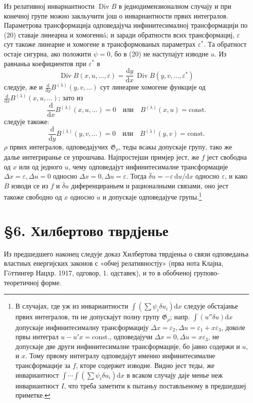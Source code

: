 ﻿\documentclass[11pt]{article}
\providecommand{\G}{\mathfrak G}
\providecommand{\eps}{\varepsilon}
\providecommand{\D}{\Delta}
\providecommand{\dd}{\mathrm d}
\DeclareMathOperator{\Div}{Div}
\providecommand{\bd}{\bar{\delta}}
\begin{document}
Из релативној инвариантности \(\Div B\) в једнодимензионалном случају и при конечној групе можно закльучити још о инвариантности првих интегралов. Параметрова трансформација одповедајуча инфинитесималној трансформацији по (20) ставаје линеарна и хомогеннá; и заради обратности всих трансформациј, \(\eps\) сут такоже линеарне и хомогене в трансформованых параметрах \(\eps^*\). Та обратност остаје сигурна, ако положити \(\psi=0\), бо в (20) не наступајут изводне \(u\). Из равнаньа коефициентов при \(\eps^*\) в
\[
\Div B(x,u,\ldots,\eps)=\frac{\dd y}{\dd x}\,\Div B(y,v,\ldots,\eps^*)
\]
следује, же и \(\frac{\dd}{\dd y}B^{(\lambda)}(y,v,\ldots)\) сут линеарне хомогене функције од \(\frac{\dd}{\dd x}B^{(\lambda)}(x,u,\ldots)\); зато из
\[
\frac{\dd}{\dd x}B^{(\lambda)}(x,u,\ldots)=0
\quad\text{или}\quad B^{(\lambda)}(x,u)=\mathrm{const.}
\]
следује такоже:
\[
\frac{\dd}{\dd y}B^{(\lambda)}(y,v,\ldots)=0
\quad\text{или}\quad B^{(\lambda)}(y,v)=\mathrm{const.}
\]
\(\rho\) првих интегралов, одповедајучих \(\G_\rho\), теды всакы допускаје групу, тако же далье интегриранье се упрошчава. Најпростејши примјер јест, же \(f\) јест свободна од \(x\) или од једного \(u\), чему одповедајут инфинитесималне трансформације \(\D x=\eps,\D u=0\) односно \(\D x=0,\D u=\eps\). Тогда \(\bd u=-\eps\,\dd u/\dd x\) односно \(\eps\), и како \(B\) изводи се из \(f\) и \(\bd u\) диференцираньем и рационалными связами, оно јест такоже свободно од \(x\) односно \(u\) и допускаје одповедајуче групы.\footnote{В случајах, где уж из инвариантности \(\int(\sum\psi_i\delta u_i)\dd x\) следује обстајанье првих интегралов, ти не допускајут полну групу \(\G_\rho\); напр. \(\int(u''\delta u)\dd x\) допускаје инфинитесималну трансформацију \(\D x=\eps_2,\D u=\eps_1+x\eps_3\), доколе првы интеграл \(u-u'x=\mathrm{const.}\), одповедајучи \(\D x=0,\D u=x\eps_3\), не допускаје две други инфинитесималне трансформације, бо јавно содержи и \(u\), и \(x\). Тому првому интегралу одповедајут именно инфинитесималне трансформације за \(f\), кторе содержет изводне. Видно јест теды, же инвариантност \(\int\!\cdots\!\int(\sum\psi_i\delta u_i)\dd x\) в всаком случају даје менье неж инвариантност \(I\), что треба заметити к пытаньу поставльеному в предшедшеј приметке.}

\section*{\S{}6. Хилбертово тврдјенье}

Из предшедшего наконец следује доказ Хилбертова тврдјеньа о связи одповеданьа властных енергијских законов с «обчеј релативностју» (прва нота Клајна, Гöттингер Нацхр. 1917, одговор, 1. одставек), и то в обобченој групово-теоретичној форме.
\end{document}

